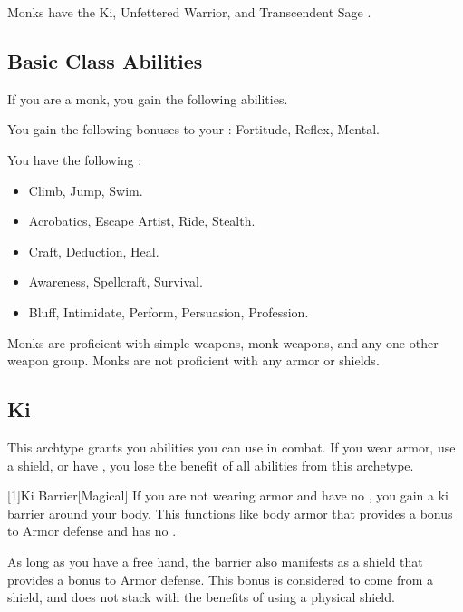      Monks have the Ki, Unfettered Warrior, and Transcendent Sage .

    \subsection{Basic Class Abilities}
        If you are a monk, you gain the following abilities.

        You gain the following bonuses to your :  Fortitude,  Reflex,  Mental.

        You have the following :
        \begin{itemize}
            \item {} Climb, Jump, Swim.
            \item {} Acrobatics, Escape Artist, Ride, Stealth.
            \item {} Craft, Deduction, Heal.
            \item {} Awareness, Spellcraft, Survival.
            \item {} Bluff, Intimidate, Perform, Persuasion, Profession.
        \end{itemize}

        Monks are proficient with simple weapons, monk weapons, and any one other weapon group.
        Monks are not proficient with any armor or shields.

    \subsection{Ki}
        This archtype grants you abilities you can use in combat.
        If you wear armor, use a shield, or have , you lose the benefit of all abilities from this archetype.

        [1]{Ki Barrier}[Magical]
        If you are not wearing armor and have no , you gain a ki barrier around your body.
        This functions like body armor that provides a  bonus to Armor defense and has no .

        As long as you have a free hand, the barrier also manifests as a shield that provides a  bonus to Armor defense.
        This bonus is considered to come from a shield, and does not stack with the benefits of using a physical shield.

